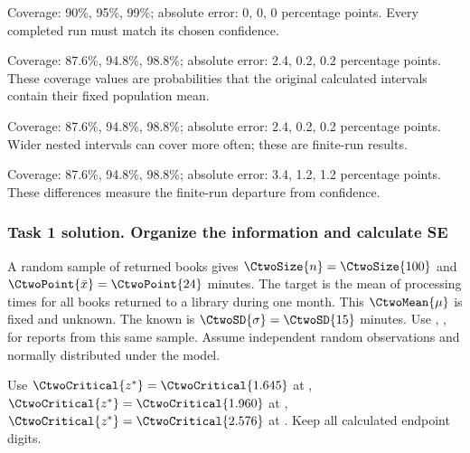 \begin{answeroptions}
\item Coverage: 90\%, 95\%, 99\%; absolute error: 0, 0, 0 percentage points. Every completed run must match its chosen confidence.
\item Coverage: 87.6\%, 94.8\%, 98.8\%; absolute error: 2.4, 0.2, 0.2 percentage points. These coverage values are probabilities that the original calculated intervals contain their fixed population mean.
\item Coverage: 87.6\%, 94.8\%, 98.8\%; absolute error: 2.4, 0.2, 0.2 percentage points. Wider nested intervals can cover more often; these are finite-run results.
\item Coverage: 87.6\%, 94.8\%, 98.8\%; absolute error: 3.4, 1.2, 1.2 percentage points. These differences measure the finite-run departure from confidence.
\end{answeroptions}
\clearpage
\subsubsection*{Task 1 solution. Organize the information and calculate SE}
\label{sol:c2-compare-three-a}
A random sample of  returned books gives $\CtwoSize{n}=\CtwoSize{100}$ and  $\CtwoPoint{\bar{x}}=\CtwoPoint{24}$ minutes. The target is the mean of processing times for all books returned to a library during one month. This  $\CtwoMean{\mu}$ is fixed and unknown. The known  is $\CtwoSD{\sigma}=\CtwoSD{15}$ minutes. Use , ,   for reports from this same sample. Assume independent random observations and normally distributed  under the model.

Use $\CtwoCritical{z^*}=\CtwoCritical{1.645}$ at , $\CtwoCritical{z^*}=\CtwoCritical{1.960}$ at , $\CtwoCritical{z^*}=\CtwoCritical{2.576}$ at . Keep all calculated endpoint digits.

